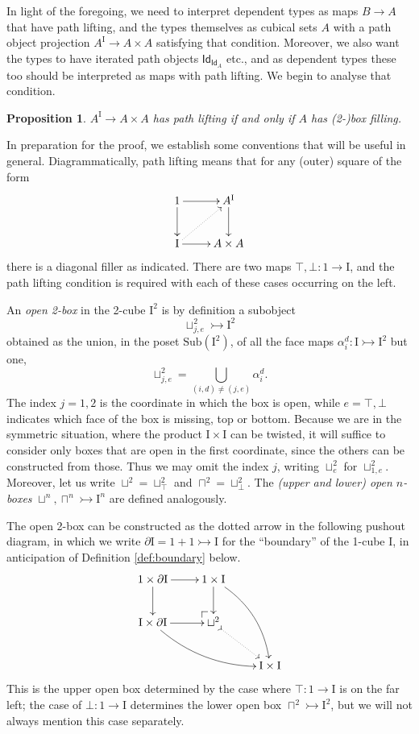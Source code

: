 \documentclass[11pt]{article}
\makeatletter
\newcommand{\pocorner}[1][dr]{\save*!/#1+1.2pc/#1:(1,-1)@^{|-}\restore}
\newcommand{\mono}{\ensuremath{\rightarrowtail}}
\newcommand{\I}{\ensuremath{\mathrm{I}}}
\newcommand{\Id}{\mathsf{Id}}
\newcommand{\id}[1]{\Id_{#1}}
\newtheorem{proposition}[theorem]{Proposition}
\theoremstyle{remark}
\theoremstyle{definition}
\makeatother
\begin{document}
In light of the foregoing, we need to interpret dependent types as maps $B\to A$ that have path lifting, and the types themselves as cubical sets $A$ with a path object projection $A^\I \to A\times A$ satisfying that condition.  Moreover, we also want the types to have iterated path objects $\id{\id{A}}$ etc.,  and as dependent types these too should be interpreted as maps with path lifting.  We begin to analyse that condition.

\begin{proposition}\label{prop:pathliftboxfill}
$A^\I \to A\times A$ has path lifting if and only if $A$ has (2-)box filling.
\end{proposition}

In preparation for the proof, we establish some conventions that will be useful in general.
Diagrammatically, path lifting means that for any (outer) square of the form
\begin{equation}\label{diagram:pathliftpath}
\xymatrix{
1 \ar[d] \ar[r] & A^\I \ar[d] \\
\I \ar[r] \ar@{..>}[ru] & A\times A
}
\end{equation}
there is a diagonal filler as indicated.  There are two maps $\top, \bot : 1\to \I$, and the path lifting condition is required with each of these cases occurring on the left.

An \emph{open 2-box} in the 2-cube $\I^2$ is by definition a subobject $$\sqcup^2_{j,e} \mono \I^2$$ obtained as the union, in the poset $\mathrm{Sub}(\I^2)$, of all the face maps $\alpha^d_i : \I \mono \I^2$ but one,
\[
\sqcup^2_{j,e}  = \bigcup_{(i,d)\neq (j,e)} \alpha_i^d.
\]
The index $j = 1, 2$ is the coordinate in which the box is open, while $e = \top, \bot$ indicates which face of the box is missing, top or bottom.   Because we are in the symmetric situation, where the product $\I\times \I$ can be twisted, it  will suffice to  consider only  boxes that are open in the first coordinate, since the others can be constructed from those.  Thus we may omit the index $j$, writing $\sqcup^2_e$ for $\sqcup^2_{1,e}$. Moreover, let us write $\sqcup^2 = {\sqcup}^2_\top$ and $\sqcap^2 = {\sqcup}^2_\bot$.  The \emph{(upper and lower) open $n$-boxes} $\sqcup^n, \sqcap^n \mono \I^n$ are defined analogously.

The open 2-box can be constructed as the dotted arrow in the following pushout diagram, in which we write $\partial\I = 1+1 \mono \I$ for the ``boundary'' of the 1-cube $\I$, in anticipation of Definition \ref{def:boundary} below.
\[
\xymatrix{
1\times \partial\I \ar[d] \ar[r]  & 1\times \I \ar[d] \ar@/{}^{1pc}/[rdd] \\
\I \times \partial\I \ar[r] \ar@/{}_{1pc}/[rrd] &  \sqcup^2 \pocorner \ar@{>.>}[rd] \\
 &&  \I\times\I 
}
\]
This is the upper open box determined by the case where $\top : 1\to\I$ is on the far left; the case of $\bot : 1\to\I$ determines the lower open box $\sqcap^2 \mono \I^2$, but we will not always mention this case separately.  
\end{document}
